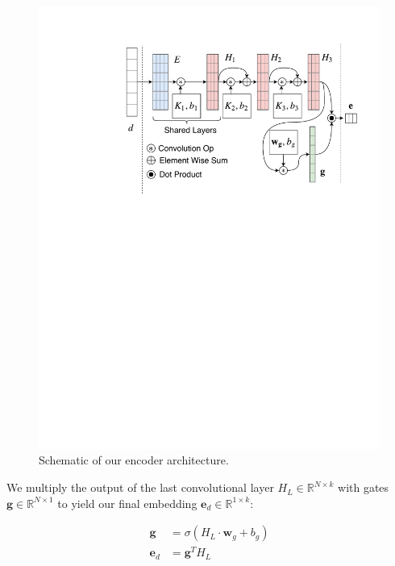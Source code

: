\documentclass[11pt,a4paper]{article}
\begin{document}
\begin{figure}
	\centering
    \includegraphics[width=\columnwidth]{figures/model.pdf}
     \vspace{-.75em}
    \caption{Schematic of our encoder architecture.}
    \label{fig:encoder}
    \vspace{-.65em}
\end{figure}


We multiply the output of the last convolutional layer $H_L \in \mathbb{R}^{N \times k}$ with gates ${\mathbf g} \in \mathbb{R}^{N \times 1}$ to yield our final embedding ${\mathbf e_d} \in \mathbb{R}^{1 \times k}$: %

\begin{equation}
\begin{aligned}
{\mathbf g} &= \sigma(H_L \cdot {\mathbf w}_g + b_g) \\
{\mathbf e_d} &= {\mathbf g}^T H_L
\end{aligned}
\label{eq:gate}
\end{equation}
\end{document}
